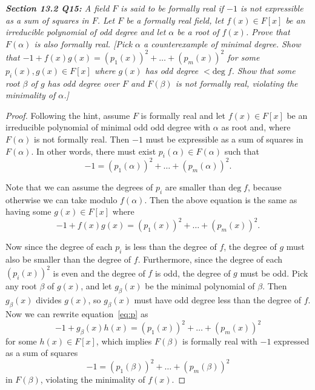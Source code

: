 \documentclass{article}
\begin{document}
\it \textbf{Section 13.2 Q15:} A field $F$ is said to be formally real if
  $-1$ is not expressible as a sum of squares in $F$. Let $F$ be a formally
  real field, let $f(x)\in F[x]$ be an irreducible polynomial of odd degree
  and let $\alpha$ be a root of $f(x)$. Prove that $F(\alpha)$ is also
  formally real. [Pick $\alpha$ a counterexample of minimal degree. Show
  that $-1+f(x)g(x) =(p_1(x))^2 +\ldots +(p_m(x))^2$ for some
  $p_i(x),g(x)\in F[x]$ where $g(x)$ has odd degree $<\text{deg}\; f$. Show
  that some root $\beta$ of $g$ has odd degree over $F$ and $F(\beta)$ is
  not formally real, violating the minimality of $\alpha$.] 

  \begin{proof}
    Following the hint, assume $F$ is formally real and let $f(x)\in F[x]$
    be an irreducible polynomial of minimal odd odd degree with $\alpha$ as
    root and, where $F(\alpha)$ is not formally real. Then $-1$ must be
    expressible as a sum of squares in $F(\alpha)$. In other words, there
    must exist $p_i(\alpha)\in F(\alpha)$ such that
    \[-1 =(p_1(\alpha))^2 +\ldots +(p_m(\alpha))^2.\]

    Note that we can assume the degrees of $p_i$ are smaller than
    $\text{deg}\; f$, because otherwise we can take modulo $f(\alpha)$.
    Then the above equation is the same as having some $g(x)\in F[x]$ where
    \begin{equation}
      -1+f(x)g(x) =(p_1(x))^2 +\ldots +(p_m(x))^2.
      \label{eq:p}
    \end{equation}

    Now since the degree of each $p_i$ is less than the degree of $f$, the
    degree of $g$ must also be smaller than the degree of $f$. Furthermore,
    since the degree of each $(p_i(x))^2$ is even and the degree of $f$ is
    odd, the degree of $g$ must be odd. Pick any root $\beta$ of $g(x)$,
    and let $g_\beta(x)$ be the minimal polynomial of $\beta$. Then
    $g_\beta(x)$ divides $g(x)$, so $g_\beta(x)$ must
    have odd degree less than the degree of $f$. Now we can rewrite
    equation~\ref{eq:p} as
    \[-1+g_\beta(x)h(x) =(p_1(x))^2 +\ldots +(p_m(x))^2\]
    for some $h(x)\in F[x]$, which implies $F(\beta)$ is formally real with
    $-1$ expressed as a sum of squares
    \[-1 =(p_1(\beta))^2 +\ldots +(p_m(\beta))^2\]
    in $F(\beta)$, violating the minimality of $f(x)$.
  \end{proof}
\end{document}
